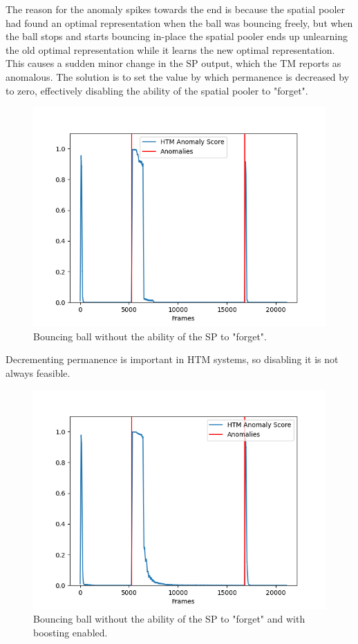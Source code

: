 The reason for the anomaly spikes towards the end is because the spatial pooler had found an optimal representation when the ball was bouncing freely, but when the ball stops and starts bouncing in-place the spatial pooler ends up unlearning the old optimal representation while it learns the new optimal representation. This causes a sudden minor change in the SP output, which the TM reports as anomalous. The solution is to set the value by which permanence is decreased by to zero, effectively disabling the ability of the spatial pooler to "forget".
\begin{figure}[H]
    \centering
    \includegraphics[width=\textwidth]{resources/experiments/bouncing_ball/bb_anoms_unforgetting.png}
    \caption{Bouncing ball without the ability of the SP to "forget".}
\end{figure}
Decrementing permanence is important in HTM systems, so disabling it is not always feasible.
\begin{figure}[H]
    \centering
    \includegraphics[width=\textwidth]{resources/experiments/bouncing_ball/bb_anoms_unforgetting_boosting.png}
    \caption{Bouncing ball without the ability of the SP to "forget" and with boosting enabled.}
\end{figure}
